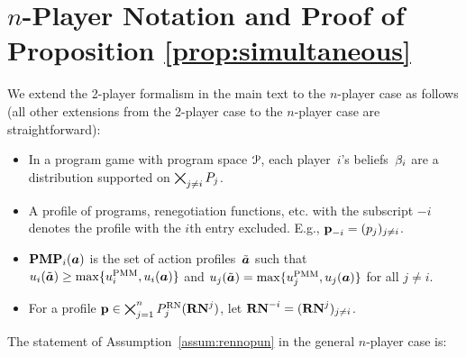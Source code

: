 \documentclass[sigconf]{aamas}
\theoremstyle{definition}
\begin{document}
\section{${n}$-Player Notation and Proof of Proposition \ref{prop:simultaneous}}

\setcounter{theorem}{1}

We extend the 2-player formalism in the main text to the ${n}$-player case as follows
(all other extensions from the 2-player case to the ${n}$-player case are straightforward):
\begin{itemize}
    \item In a program game with program space $\mathcal{P}$, each player~$i$'s beliefs~$\beta_i$ are a distribution supported on $\bigtimes_{j \neq i} P_j$.
    \item A profile of programs, renegotiation functions, etc. with the subscript $-i$ denotes the profile with the $i$th entry excluded. E.g., $\textbf{p}_{-i} = (p_j)_{j \neq i}$. 
    \item $\mathbf{PMP}_i(\boldsymbol{a})$
    is the set of action profiles~$\tilde{\boldsymbol{a}}$
    such that
    $u_i(\tilde{\boldsymbol{a}}) \geq \max\{u_i^{\textnormal{PMM}}, u_i(\boldsymbol{a})\}$
    and
    $u_j(\tilde{\boldsymbol{a}}) = \max\{u_j^{\textnormal{PMM}}, u_j(\boldsymbol{a})\}$ for all $j \neq i$. 
    \item For a profile $\textbf{p} \in \bigtimes_{j=1}^{n} P_j^{\textnormal{RN}}(\mathbf{RN}^{j})$, let $\mathbf{RN}^{-i} = (\mathbf{RN}^{j})_{j \neq i}$.
\end{itemize}

The statement of Assumption~\ref{assum:rennopun} in the general ${n}$-player case is:

\setcounter{definition}{3}
\end{document}
